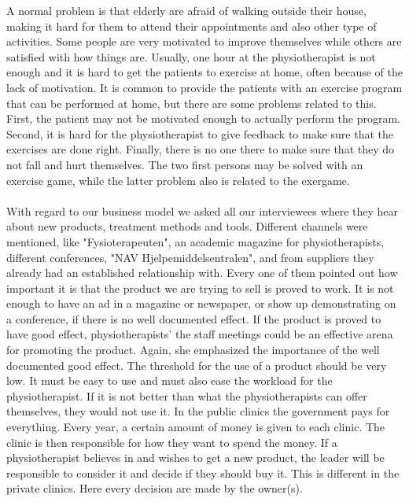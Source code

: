 A normal problem is that elderly are afraid of walking outside their house, making it hard for them to attend their appointments and also other type of activities. Some people are very motivated to improve themselves while others are satisfied with how things are. Usually, one hour at the physiotherapist is not enough and it is hard to get the patients to exercise at home, often because of the lack of motivation. It is common to provide the patients with an exercise program that can be performed at home, but there are some problems related to this. First, the patient may not be motivated enough to actually perform the program. Second, it is hard for the physiotherapist to give feedback to make sure that the exercises are done right. Finally, there is no one there to make sure that they do not fall and hurt themselves. The two first persons may be solved with an exercise game, while the latter problem also is related to the exergame.  \\ \\
With regard to our business model we asked all our interviewees where they hear about new products, treatment methods and tools. Different channels were mentioned, like "Fysioterapeuten", an academic magazine for physiotherapists, different conferences, "NAV Hjelpemiddelsentralen", and from suppliers they already had an established relationship with. Every one of them pointed out how important it is that the product we are trying to sell is proved to work. It is not enough to have an ad in a magazine or newspaper, or show up demonstrating on a conference, if there is no well documented effect. If the product is proved to have good effect, physiotherapists' the staff meetings could be an effective arena for promoting the product. Again, she emphasized the importance of the well documented good effect. The threshold for the use of a product should be very low. It must be easy to use and must also ease the workload for the physiotherapist. If it is not better than what the physiotherapists can offer themselves, they would not use it. In the public clinics the government pays for everything. Every year, a certain amount of money is given to each clinic. The clinic is then responsible for how they want to spend the money. If a physiotherapist believes in and wishes to get a new product, the leader will be responsible to consider it and decide if they should buy it. This is different in the private clinics. Here every decision are made by the owner(s). \\ \\
